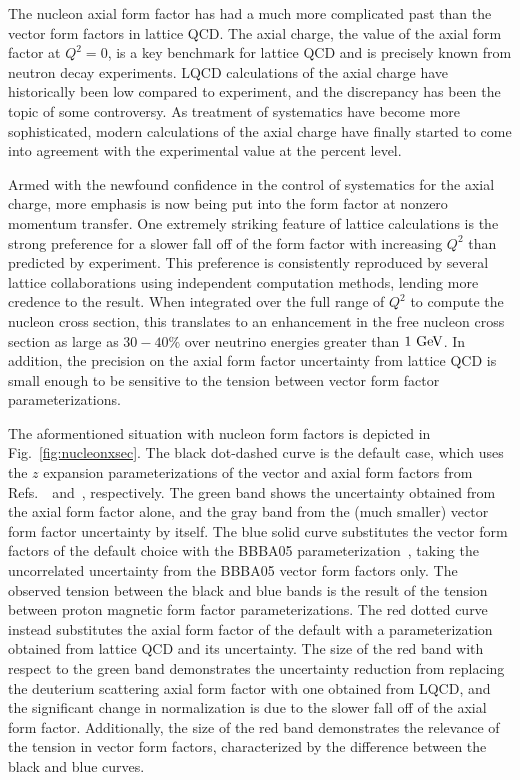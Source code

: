 The nucleon axial form factor has had a much more complicated past
 than the vector form factors in lattice QCD.
The axial charge, the value of the axial form factor at $Q^2=0$,
 is a key benchmark for lattice QCD and is precisely known
 from neutron decay experiments.
LQCD calculations of the axial charge have historically been low compared
 to experiment, and the discrepancy has been the topic of some controversy.
As treatment of systematics have become more sophisticated,
 modern calculations of the axial charge have finally started to come into
 agreement with the experimental value at the percent level.

Armed with the newfound confidence in the control of systematics for the axial charge,
 more emphasis is now being put into the form factor at nonzero momentum transfer.
One extremely striking feature of lattice calculations is the strong preference for a slower
 fall off of the form factor with increasing $Q^2$ than predicted by experiment.
This preference is consistently reproduced by several lattice collaborations using
 independent computation methods, lending more credence to the result.
When integrated over the full range of $Q^2$ to compute the nucleon cross section,
 this translates to an enhancement in the free nucleon cross section as large as $30-40\%$
 over neutrino energies greater than $1~{\rm GeV}$.
In addition, the precision on the axial form factor uncertainty from lattice QCD
 is small enough to be sensitive to the tension between vector form factor parameterizations.

The aformentioned situation with nucleon form factors
 is depicted in Fig.~\ref{fig:nucleonxsec}.
The black dot-dashed curve is the default case,
 which uses the $z$ expansion parameterizations of the vector and axial
 form factors from Refs.~\cite{Borah:2020gte}~and~\cite{Meyer:2016oeg}, respectively.
The green band shows the uncertainty obtained from the axial form factor alone,
 and the gray band from the (much smaller) vector form factor uncertainty by itself.
The blue solid curve substitutes the vector form factors of the default choice
 with the BBBA05 parameterization~\cite{Bradford:2006yz},
 taking the uncorrelated uncertainty from the BBBA05 vector form factors only.
The observed tension between the black and blue bands is the result of the
 tension between proton magnetic form factor parameterizations.
The red dotted curve instead substitutes the axial form factor of the default
 with a parameterization obtained from lattice QCD and its uncertainty.
The size of the red band with respect to the green band demonstrates
 the uncertainty reduction from replacing the deuterium scattering
 axial form factor with one obtained from LQCD,
 and the significant change in normalization is due to the slower fall off
 of the axial form factor.
Additionally, the size of the red band demonstrates the relevance
 of the tension in vector form factors, characterized by the difference
 between the black and blue curves.

